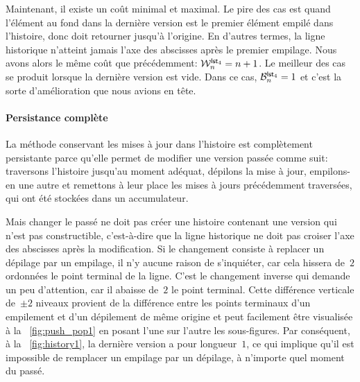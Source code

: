 Maintenant, il existe un coût minimal et maximal. Le pire des cas est
quand l'élément au fond dans la dernière version est le premier
élément empilé dans l'histoire, donc
 doit retourner jusqu'à
l'origine. En d'autres termes, la ligne historique n'atteint jamais
l'axe des abscisses après le premier empilage. Nous avons alors le
même coût que précédemment: \(\W{\fun{lst}_4}{n} = n +
1\).  Le meilleur des cas se produit lorsque la dernière version est vide. Dans ce cas, \(\B{\fun{lst}_4}{n} =
1\) et c'est la sorte d'amélioration que nous avions en tête.


\paragraph{Persistance complète}

La méthode conservant les mises à jour dans l'histoire est
complètement persistante parce qu'elle permet de modifier une version
passée comme suit: traversons l'histoire jusqu'au moment adéquat,
dépilons la mise à jour, empilons-en une autre et remettons à leur
place les mises à jours précédemment traversées, qui ont été stockées
dans un accumulateur.

Mais changer le passé ne doit pas créer une histoire contenant une
version qui n'est pas constructible, c'est-à-dire que la ligne
historique ne doit pas croiser l'axe des abscisses après la
modification. Si le changement consiste à replacer un dépilage par un
empilage, il n'y aucune raison de s'inquiéter, car cela hissera
de~\(2\) ordonnées le point terminal de la ligne. C'est le changement
inverse qui demande un peu d'attention, car il abaisse de~\(2\) le
point terminal. Cette différence verticale de~\(\pm 2\) niveaux
provient de la différence entre les points terminaux d'un empilement
et d'un dépilement de même origine et peut facilement être visualisée
à la \fig~\vref{fig:push_pop1} en posant l'une sur l'autre les
sous-figures. Par conséquent, à la \fig~\ref{fig:history1}, la
dernière version a pour longueur~\(1\), ce qui implique qu'il est
impossible de remplacer un empilage par un dépilage, à n'importe quel
moment du passé.

